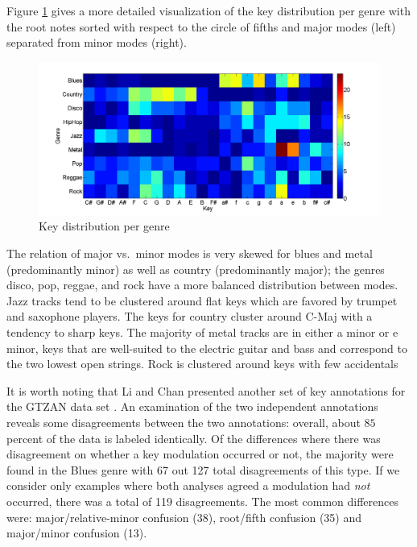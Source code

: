 \documentclass{article}
\begin{document}
Figure \ref{fig:KeyDistributionPerGenre} gives a more detailed visualization of the key distribution per genre with the root notes sorted with respect to the circle of fifths and major modes (left) separated from minor modes (right). 
\begin{figure}
    \includegraphics[scale=.2]{graph/key_distribution_colour_legend}
	\caption{Key distribution per genre}
	\label{fig:KeyDistributionPerGenre}
\end{figure}
The relation of major vs.\ minor modes is very skewed for blues and metal (predominantly minor) as well as country (predominantly major); the genres disco, pop, reggae, and rock have a more balanced distribution between modes. Jazz tracks tend to be clustered around flat keys which are favored by trumpet and saxophone players. The keys for country cluster around C-Maj with a tendency to sharp keys. The majority of metal tracks are in either a minor or e minor, keys that are well-suited to the electric guitar and bass and correspond to the two lowest open strings. Rock is clustered around keys with few accidentals


It is worth noting that Li and Chan presented another set of key annotations for the GTZAN data set \cite{li_genre_2011}. An examination of the two independent annotations reveals some disagreements between the two annotations: overall, about $85$ percent of the data is labeled identically. 
Of the differences where there was disagreement on whether a key modulation occurred or not, the majority were found in the Blues genre with 67 out 127 total disagreements of this type. If we consider only examples where both analyses agreed a modulation had \textit{not} occurred, there was a total of 119 disagreements. The most common differences were: major/relative-minor confusion (38), root/fifth confusion (35) and major/minor confusion (13).
\end{document}
